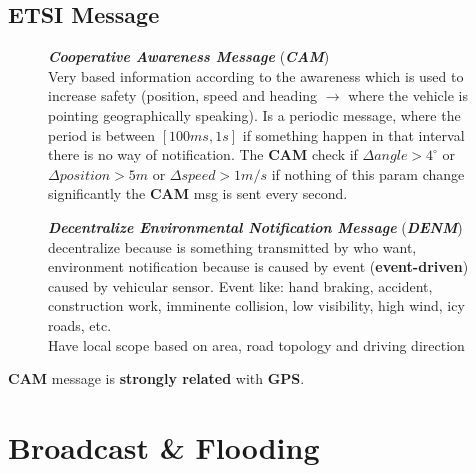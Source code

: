 \subsection{ETSI Message}

\begin{figure}[h]
    \centering
    \begin{minipage}[t]{0.45\textwidth}
        \centering
        \textbf{\textit{Cooperative Awareness Message}} (\textbf{\textit{CAM}}) \\
        Very based information according to the awareness which is used to increase safety (position, speed and heading $\rightarrow$ where the vehicle is pointing geographically speaking). Is a periodic message, where the period is between $[100ms, 1s]$ if something happen in that interval there is no way of notification. The \textbf{CAM} check if $\Delta angle > 4^{\circ}$ or $\Delta position > 5m$ or $\Delta speed > 1m/s$ if nothing of this param change significantly the \textbf{CAM} msg is sent every second. 
    \end{minipage}
    \begin{minipage}[t]{0.45\textwidth}
        \centering
        \textbf{\textit{Decentralize Environmental Notification Message}} (\textbf{\textit{DENM}}) \\
        decentralize because is something transmitted by who want, environment notification because is caused by event (\textbf{event-driven}) caused by vehicular sensor. Event like: hand braking, accident, construction work, imminente collision, low visibility, high wind, icy roads, etc. \\
        Have local scope based on area, road topology and driving direction        
    \end{minipage}
\end{figure}
\textbf{CAM} message is \textbf{strongly related} with \textbf{GPS}.

\section{Broadcast \& Flooding}